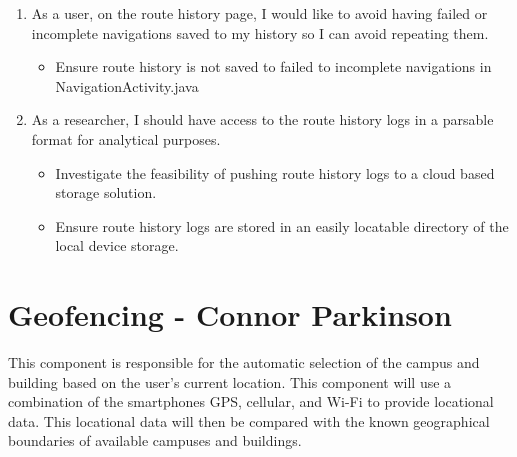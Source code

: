 \documentclass{scrreprt}
\begin{document}
\begin{enumerate}
	\item As a user, on the route history page, I would like to avoid having failed or incomplete navigations saved to my history so I can avoid repeating them.
	
		\begin{itemize}
			\item Ensure route history is not saved to failed to incomplete navigations in NavigationActivity.java
		\end{itemize}
	
	\item As a researcher, I should have access to the route history logs in a parsable format for analytical purposes.
	
		\begin{itemize}
			\item Investigate the feasibility of pushing route history logs to a cloud based storage solution.
			\item Ensure route history logs are stored in an easily locatable directory of the local device storage.
		\end{itemize}
	
\end{enumerate}

\pagebreak

\section{Geofencing - Connor Parkinson}
This component is responsible for the automatic selection of the campus and building based on the user’s current location. This component will use a combination of the smartphones GPS, cellular, and Wi-Fi to provide locational data. This locational data will then be compared with the known geographical boundaries of available campuses and buildings.
\end{document}
